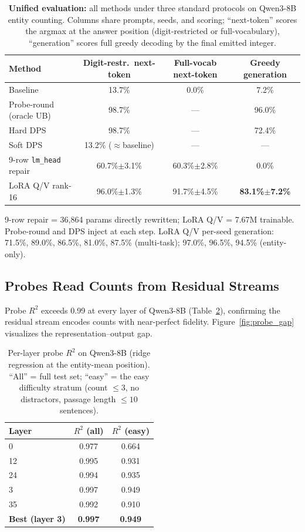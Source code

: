 \documentclass{article}
\begin{document}
\begin{table}[t]
\centering
\small
\caption{\textbf{Unified evaluation:} all methods under three standard protocols
  on Qwen3-8B entity counting. Columns share prompts, seeds, and scoring;
  ``next-token'' scores the argmax at the answer position (digit-restricted or
  full-vocabulary), ``generation'' scores full greedy decoding by the final
  emitted integer.}
\label{tab:unified_evaluation}
\begin{tabular}{lccc}
\toprule
\textbf{Method} & \textbf{Digit-restr.\ next-token} & \textbf{Full-vocab next-token} & \textbf{Greedy generation} \\
\midrule
Baseline & 13.7\% & 0.0\% & 7.2\% \\
Probe-round (oracle UB) &  98.7\% & --- & 96.0\% \\
Hard DPS & 98.7\% & --- & 72.4\% \\
Soft DPS & 13.2\% ($\approx$baseline) & --- & --- \\
9-row \texttt{lm\_head} repair & 60.7\%$\pm$3.1\% & 60.3\%$\pm$2.8\% & 0.0\% \\
LoRA Q/V rank-16 & 96.0\%$\pm$1.3\% & 91.7\%$\pm$4.5\% & \textbf{83.1\%$\pm$7.2\%} \\
\bottomrule
\end{tabular}
\vspace{3pt}
\par\scriptsize
9-row repair = 36,864 params directly rewritten; LoRA Q/V = 7.67M trainable.
Probe-round and DPS inject at each step. LoRA Q/V per-seed generation:
71.5\%, 89.0\%, 86.5\%, 81.0\%, 87.5\% (multi-task); 97.0\%, 96.5\%,
94.5\% (entity-only).
\end{table}

\subsection{Probes Read Counts from Residual Streams}

Probe $R^2$ exceeds 0.99 at every layer of Qwen3-8B (Table~\ref{tab:probe_r2}),
confirming the residual stream encodes counts with near-perfect fidelity.
Figure~\ref{fig:probe_gap} visualizes the representation--output gap.

\begin{table}[t]
\centering
\caption{Per-layer probe $R^2$ on Qwen3-8B (ridge regression at the entity-mean
  position). ``All'' = full test set; ``easy'' = the easy difficulty stratum
  (count $\leq 3$, no distractors, passage length $\leq 10$ sentences).}
\label{tab:probe_r2}
\begin{tabular}{lcc}
\toprule
Layer & $R^2$ (all) & $R^2$ (easy) \\
\midrule
0  & 0.977 & 0.664 \\
12 & 0.995 & 0.931 \\
24 & 0.994 & 0.935 \\
3 & 0.997 & 0.949 \\
35 & 0.992 & 0.910 \\
\midrule
\textbf{Best (layer 3)} & \textbf{0.997} & \textbf{0.949} \\
\bottomrule
\end{tabular}
\end{table}
\end{document}
